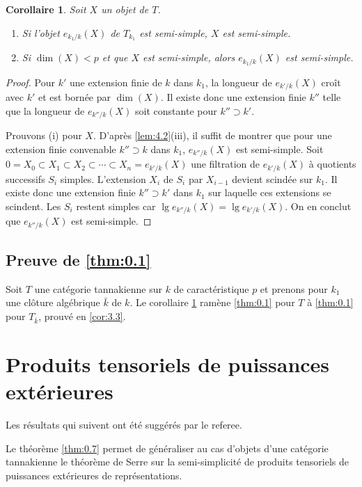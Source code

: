 \documentclass[11pt,a4paper]{article}
\theoremstyle{plain}
\newtheorem{corollary}[theorem]{Corollaire}
\theoremstyle{definition}
\begin{document}
\begin{corollary}\label{cor:4.11}
Soit $X$ un objet de $T$.
\begin{enumerate}[label=(\roman*)]
\item Si l'objet $e_{k_1/k}(X)$ de $T_{k_1}$ est semi-simple, $X$ est semi-simple.
\item Si $\dim(X) < p$ et que $X$ est semi-simple, alors $e_{k_1/k}(X)$ est semi-simple.
\end{enumerate}
\end{corollary}

\begin{proof}
Pour $k'$ une extension finie de $k$ dans $k_1$, la longueur de $e_{k'/k}(X)$ cro\^it avec $k'$ et est born\'ee par $\dim(X)$. Il existe donc une extension finie $k''$ telle que la longueur de $e_{k''/k}(X)$ soit constante pour $k'' \supset k'$.

Prouvons (i) pour $X$. D'apr\`es \ref{lem:4.2}(iii), il suffit de montrer que pour une extension finie convenable $k'' \supset k$ dans $k_1$, $e_{k''/k}(X)$ est semi-simple. Soit $0 = X_0 \subset X_1 \subset X_2 \subset \cdots \subset X_n = e_{k'/k}(X)$ une filtration de $e_{k'/k}(X)$ \`a quotients successifs $S_i$ simples. L'extension $X_i$ de $S_i$ par $X_{i-1}$ devient scind\'ee sur $k_1$. Il existe donc une extension finie $k'' \supset k'$ dans $k_1$ sur laquelle ces extensions se scindent. Les $S_i$ restent simples car $\lg e_{k''/k}(X) = \lg e_{k'/k}(X)$. On en conclut que $e_{k''/k}(X)$ est semi-simple.
\end{proof}

\subsection{Preuve de \ref{thm:0.1}}\label{sec:4.12}

Soit $T$ une cat\'egorie tannakienne sur $k$ de caract\'eristique $p$ et prenons pour $k_1$ une cl\^oture alg\'ebrique $\bar{k}$ de $k$. Le corollaire \ref{cor:4.11} ram\`ene \ref{thm:0.1} pour $T$ \`a \ref{thm:0.1} pour $T_{\bar{k}}$, prouv\'e en \ref{cor:3.3}.

\section{Produits tensoriels de puissances ext\'erieures}\label{sec:5}

Les r\'esultats qui suivent ont \'et\'e sugg\'er\'es par le referee.

Le th\'eor\`eme \ref{thm:0.7} permet de g\'en\'eraliser au cas d'objets d'une cat\'egorie tannakienne le th\'eor\`eme de Serre \cite{Serre2003} sur la semi-simplicit\'e de produits tensoriels de puissances ext\'erieures de repr\'esentations.
\end{document}
